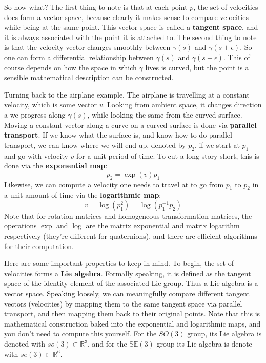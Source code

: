 So now what?
The first thing to note is that at each point $ p  $,
the set of velocities does form a vector space, because clearly
it makes sense to compare velocities while being at the same point.
This vector space is called a \textbf{tangent space}, and it is always
associated with the point it is attached to.
The second thing to note is that the velocity vector changes 
smoothly between $ \gamma (s)  $ and $ \gamma (s + \epsilon)  $.
So one can form a differential relationship between 
$ \dot{\gamma} (s)  $ and $ \dot{\gamma} (s + \epsilon)  $.
This of course depends on how the space in which $ \gamma  $ lives is curved,
but the point is a sensible mathematical description can be constructed.

Turning back to the airplane example. The airplane is travelling at a constant velocity,
which is some vector $ v  $. Looking from ambient space, it changes direction
a we progress along $ \gamma (s)  $, while looking the same from the curved surface.
Moving a constant vector along a curve on a curved surface 
is done via \textbf{parallel transport}.
If we know what the surface is, and know how to do parallel transport,
we can know where we will end up, denoted by $ p_{ 2 }  $, if we start at $ p_{ 1 }  $
and go with velocity $ v  $ for a unit period of time.
To cut a long story short, this is done via
the \textbf{exponential map}:
\begin{equation}
p_{ 2 } = \exp (v) p_{ 1 }
\end{equation}
Likewise, we can compute a velocity one needs to travel at to go from
$ p_{ 1 }  $ to $ p_{ 2 }  $ in a unit amount of time via
the \textbf{logarithmic map}:
\begin{equation}
v = \log (p_{ 1 }^{ 2 }) = \log (p_{ 1 }^{ -1 }p_{ 2 })
\end{equation}
Note that for rotation matrices and homogeneous transformation matrices,
the operations $ \exp  $ and $ \log  $ are the matrix exponential
and matrix logarithm respectively (they're different for quaternions),
and there are efficient algorithms for their computation.

Here are some important properties to keep in mind.
To begin, the set of velocities forms a \textbf{Lie algebra}.
Formally speaking, it is defined as the tangent space of the identity
element of the associated Lie group. 
Thus a Lie algebra is a vector space.
Speaking loosely, we can meaningfully compare different tangent vectors (velocities)
by mapping them to the same tangent space via parallel transport,
and then mapping them back to their original points.
Note that this is mathematical construction baked into the exponential
and logarithmic maps, and you don't need to compute this yourself.
For the $ SO (3)  $ group, its Lie algebra is denoted with 
$ so (3) \subset \mathbb{R}^{3} $,
and for the $ \mathbb{SE}(3)  $ group its Lie algebra
is denote with $ se(3) \subset \mathbb{R}^{6}  $.

